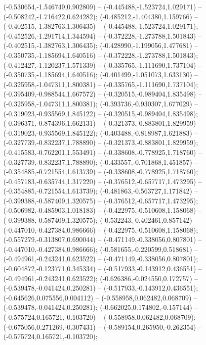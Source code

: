  (-0.530654,-1.546749,0.902809) -- (-0.445488,-1.523724,1.029171) -- (-0.508242,-1.716422,0.624282);
 (-0.485212,-1.404380,1.159766) -- (-0.402515,-1.382763,1.306435) -- (-0.445488,-1.523724,1.029171);
 (-0.452526,-1.291714,1.344594) -- (-0.372228,-1.273788,1.501843) -- (-0.402515,-1.382763,1.306435);
 (-0.428990,-1.199056,1.477681) -- (-0.350735,-1.185694,1.640516) -- (-0.372228,-1.273788,1.501843);
 (-0.412427,-1.120237,1.571339) -- (-0.335765,-1.111690,1.737104) -- (-0.350735,-1.185694,1.640516);
 (-0.401499,-1.051073,1.633130) -- (-0.325958,-1.047311,1.800381) -- (-0.335765,-1.111690,1.737104);
 (-0.395409,-0.988544,1.667572) -- (-0.320515,-0.989404,1.835498) -- (-0.325958,-1.047311,1.800381);
 (-0.393736,-0.930307,1.677029) -- (-0.319023,-0.935569,1.845122) -- (-0.320515,-0.989404,1.835498);
 (-0.396371,-0.874396,1.662131) -- (-0.321373,-0.883801,1.829959) -- (-0.319023,-0.935569,1.845122);
 (-0.403488,-0.818987,1.621883) -- (-0.327739,-0.832237,1.788890) -- (-0.321373,-0.883801,1.829959);
 (-0.415583,-0.762201,1.553491) -- (-0.338608,-0.778925,1.718760) -- (-0.327739,-0.832237,1.788890);
 (-0.433557,-0.701868,1.451857) -- (-0.354885,-0.721554,1.613739) -- (-0.338608,-0.778925,1.718760);
 (-0.457183,-0.635744,1.317220) -- (-0.376512,-0.657717,1.473295) -- (-0.354885,-0.721554,1.613739);
 (-0.481863,-0.563727,1.171842) -- (-0.399388,-0.587409,1.320575) -- (-0.376512,-0.657717,1.473295);
 (-0.506982,-0.485903,1.018183) -- (-0.422975,-0.510608,1.158068) -- (-0.399388,-0.587409,1.320575);
 (-0.532243,-0.402461,0.857142) -- (-0.447010,-0.427384,0.986666) -- (-0.422975,-0.510608,1.158068);
 (-0.557279,-0.313807,0.690044) -- (-0.471149,-0.338056,0.807801) -- (-0.447010,-0.427384,0.986666);
 (-0.581655,-0.220599,0.518681) -- (-0.494961,-0.243241,0.623522) -- (-0.471149,-0.338056,0.807801);
 (-0.604872,-0.123771,0.345334) -- (-0.517933,-0.143912,0.436551) -- (-0.494961,-0.243241,0.623522);
 (-0.626386,-0.024550,0.172757) -- (-0.539478,-0.041424,0.250281) -- (-0.517933,-0.143912,0.436551);
 (-0.645626,0.075556,0.004112) -- (-0.558958,0.062482,0.068709) -- (-0.539478,-0.041424,0.250281);
 (-0.662025,0.174802,-0.157144) -- (-0.575724,0.165721,-0.103720) -- (-0.558958,0.062482,0.068709);
 (-0.675056,0.271269,-0.307431) -- (-0.589154,0.265950,-0.262354) -- (-0.575724,0.165721,-0.103720);
